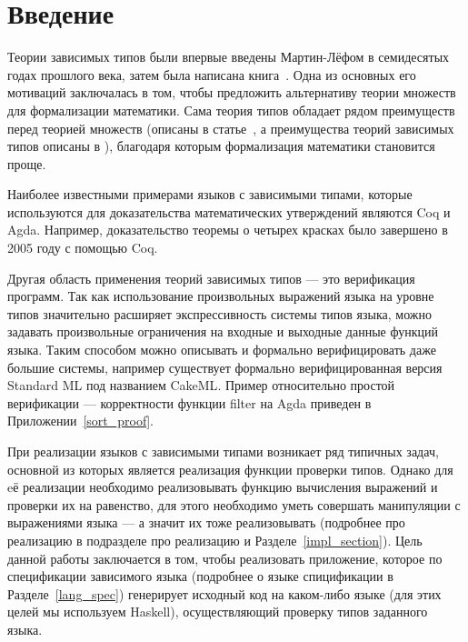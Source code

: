 \section*{Введение}
Теории зависимых типов были впервые введены Мартин-Лёфом в семидесятых годах прошлого века\cite{early_lof}, затем была написана книга~\cite{martin_lof}. Одна из основных его мотиваций заключалась в том, чтобы предложить альтернативу теории множеств для формализации математики. Сама теория типов обладает рядом преимуществ перед теорией множеств (описаны в статье~\cite{farmer_seven}, а преимущества теорий зависимых типов описаны в \cite{shulman_homotopy}), благодаря которым формализация математики становится проще.


Наиболее известными примерами языков с зависимыми типами, которые используются для доказательства математических утверждений являются Coq\cite{coq} и Agda\cite{agda}. Например, доказательство теоремы о четырех красках было завершено в 2005 году с помощью Coq\cite{weisstein2002four}.

Другая область применения теорий зависимых типов --- это верификация программ. Так как использование произвольных выражений языка на уровне типов значительно расширяет экспрессивность системы типов языка, можно задавать произвольные ограничения на входные и выходные данные функций языка. Таким способом можно описывать и формально верифицировать даже большие системы, например существует формально верифицированная версия Standard ML\cite{ml_lang} под названием CakeML\cite{ml_cake}. Пример относительно простой верификации --- корректности функции filter на Agda приведен в Приложении~\ref{sort_proof}.

\hfill

При реализации языков с зависимыми типами возникает ряд типичных задач, основной из которых является реализация функции проверки типов. Однако для eё реализации необходимо реализовывать функцию вычисления выражений и проверки их на равенство, для этого необходимо уметь совершать манипуляции с выражениями языка --- а значит их тоже реализовывать (подробнее про реализацию в подразделе про реализацию и Разделе~\ref{impl_section}). Цель данной работы заключается в том, чтобы реализовать приложение, которое по спецификации зависимого языка (подробнее о языке спицификации в Разделе~\ref{lang_spec}) генерирует исходный код на каком-либо языке (для этих целей мы используем Haskell\cite{haskell}), осуществляющий проверку типов заданного языка.

